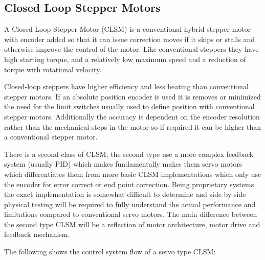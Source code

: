 \documentclass{article}
\begin{document}
\subsection{Closed Loop Stepper Motors}
A Closed Loop Stepper Motor (CLSM) is a conventional hybrid stepper motor with encoder added so that it can issue correction moves if it skips or stalls and otherwise improve the control of the motor. Like conventional steppers they have high starting torque, and a relatively low maximum speed and a reduction of torque with rotational velocity.
\par
Closed-loop steppers have higher efficiency and less heating than conventional stepper motors. If an absolute position encoder is used it is removes or minimized the need for the limit switches usually used to define position with conventional stepper motors. Additionally the accuracy is dependent on the encoder resolution rather than the mechanical steps in the motor so if required it can be higher than a conventional stepper motor.
\par 
There is a second class of CLSM, the second type use a more complex feedback system (usually PID) which makes fundamentally makes them servo motors which differentiates them from more basic CLSM implementations which only use the encoder for error correct or end point correction. Being proprietary systems the exact implementation is somewhat difficult to determine and side by side physical testing will be required to fully understand the actual performance and limitations compared to conventional servo motors. The main difference between the second type CLSM will be a reflection of motor architecture, motor drive and feedback mechanism.   
\par
The following shows the control system flow of a servo type CLSM: 
\end{document}
